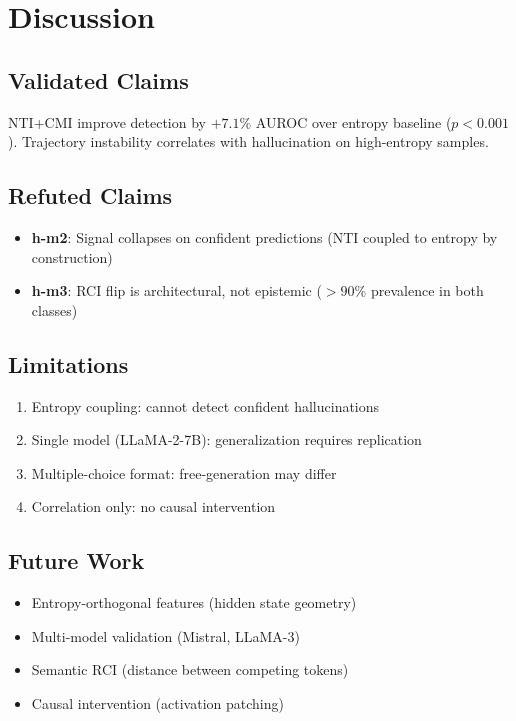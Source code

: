 \section{Discussion}

\subsection{Validated Claims}
NTI+CMI improve detection by $+7.1\%$ AUROC over entropy baseline ($p < 0.001$). Trajectory instability correlates with hallucination on high-entropy samples.

\subsection{Refuted Claims}
\begin{itemize}
    \item \textbf{h-m2}: Signal collapses on confident predictions (NTI coupled to entropy by construction)
    \item \textbf{h-m3}: RCI flip is architectural, not epistemic ($>90\%$ prevalence in both classes)
\end{itemize}

\subsection{Limitations}
\begin{enumerate}
    \item Entropy coupling: cannot detect confident hallucinations
    \item Single model (LLaMA-2-7B): generalization requires replication
    \item Multiple-choice format: free-generation may differ
    \item Correlation only: no causal intervention
\end{enumerate}

\subsection{Future Work}
\begin{itemize}
    \item Entropy-orthogonal features (hidden state geometry)
    \item Multi-model validation (Mistral, LLaMA-3)
    \item Semantic RCI (distance between competing tokens)
    \item Causal intervention (activation patching)
\end{itemize}

